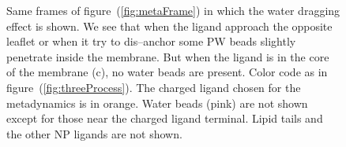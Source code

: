 \begin{figure}[!ht]
{	}%
	\caption{Same frames of figure~(\ref{fig:metaFrame}) in which the water dragging effect is shown. We see that when the ligand approach the opposite leaflet or when it try to dis--anchor some \acs{PW} beads slightly penetrate inside the membrane. But when the ligand is in the core of the membrane (c), no water beads are present. Color code as in figure~(\ref{fig:threeProcess}). The charged ligand chosen for the metadynamics is in orange. Water beads (pink) are not shown except for those near the charged ligand terminal. Lipid tails and the other \acs{NP} ligands are not shown.}%
	\label{fig:PWDragging}
\end{figure}
\begin{figure}[ht!]
	\center
	\\%
\end{figure}
